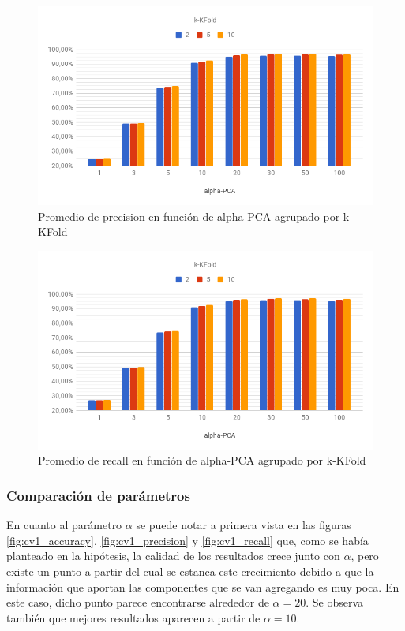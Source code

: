 \begin{figure}
    \centering
    \includegraphics[width=\textwidth]{graficos/cv_cmp_folds_precision.png}
    \caption{Promedio de precision en función de alpha-PCA agrupado por k-KFold}
    \label{fig:cv_cmp_folds_precision}
\end{figure}

\begin{figure}
    \centering
    \includegraphics[width=\textwidth]{graficos/cv_cmp_folds_recall.png}
    \caption{Promedio de recall en función de alpha-PCA agrupado por k-KFold}
    \label{fig:cv_cmp_folds_recall}
\end{figure}

\subsubsection{Comparación de parámetros}

En cuanto al parámetro $\alpha$ se puede notar a primera vista en las figuras \ref{fig:cv1_accuracy}, \ref{fig:cv1_precision} y \ref{fig:cv1_recall} que, como se había planteado en la hipótesis, la calidad de los resultados crece junto con $\alpha$, pero existe un punto a partir del cual se estanca este crecimiento debido a que la información que aportan las componentes que se van agregando es muy poca. En este caso, dicho punto parece encontrarse alrededor de $\alpha = 20$. Se observa también que mejores resultados aparecen a partir de $\alpha = 10$.

